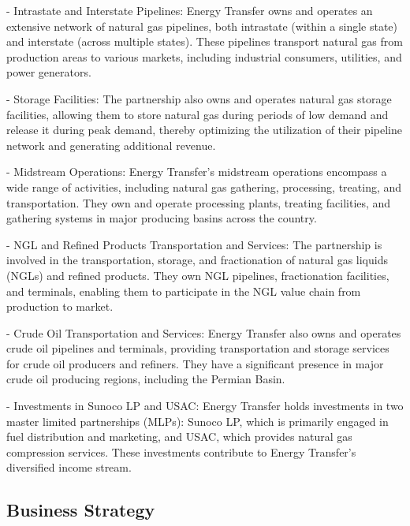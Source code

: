 \documentclass[9pt,a4paper,twoside]{tau}
\begin{document}
        - Intrastate and Interstate Pipelines: Energy Transfer owns and operates an extensive network of natural gas pipelines, both intrastate (within a single state) and interstate (across multiple states). These pipelines transport natural gas from production areas to various markets, including industrial consumers, utilities, and power generators\cite{energy-transfer-2024}.
        
        - Storage Facilities: The partnership also owns and operates natural gas storage facilities, allowing them to store natural gas during periods of low demand and release it during peak demand, thereby optimizing the utilization of their pipeline network and generating additional revenue\cite{energy-transfer-2024}.
        
        - Midstream Operations: Energy Transfer's midstream operations encompass a wide range of activities, including natural gas gathering, processing, treating, and transportation. They own and operate processing plants, treating facilities, and gathering systems in major producing basins across the country\cite{energy-transfer-2024}.
        
        - NGL and Refined Products Transportation and Services: The partnership is involved in the transportation, storage, and fractionation of natural gas liquids (NGLs) and refined products. They own NGL pipelines, fractionation facilities, and terminals, enabling them to participate in the NGL value chain from production to market\cite{energy-transfer-2024}.
        
        - Crude Oil Transportation and Services: Energy Transfer also owns and operates crude oil pipelines and terminals, providing transportation and storage services for crude oil producers and refiners. They have a significant presence in major crude oil producing regions, including the Permian Basin\cite{energy-transfer-2024}.
        
        - Investments in Sunoco LP and USAC: Energy Transfer holds investments in two master limited partnerships (MLPs): Sunoco LP, which is primarily engaged in fuel distribution and marketing, and USAC, which provides natural gas compression services. These investments contribute to Energy Transfer's diversified income stream\cite{energy-transfer-2024}.


    \subsection{Business Strategy}
    
\end{document}
